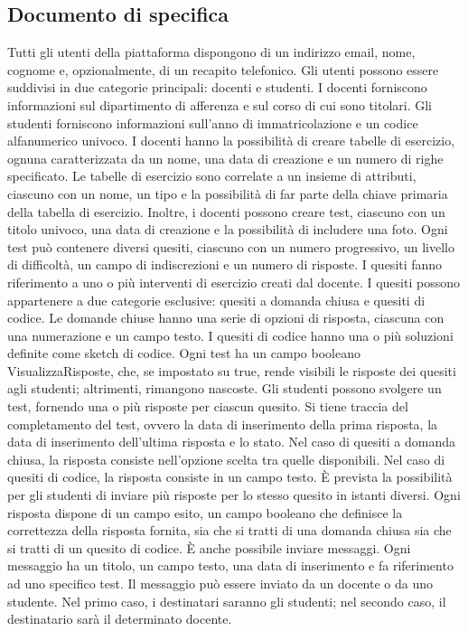 \documentclass{article}
\begin{document}
\subsection{Documento di specifica}
\large
Tutti gli utenti della piattaforma dispongono di un indirizzo email, nome, cognome e, opzionalmente, di un recapito telefonico. Gli utenti possono essere suddivisi in due categorie principali: docenti e studenti. I docenti forniscono informazioni sul dipartimento di afferenza e sul corso di cui sono titolari.
Gli studenti forniscono informazioni sull'anno di immatricolazione e un codice alfanumerico univoco.
I docenti hanno la possibilità di creare tabelle di esercizio, ognuna caratterizzata da un nome, una data di creazione e un numero di righe specificato. Le tabelle di esercizio sono correlate a un insieme di attributi, ciascuno con un nome, un tipo e la possibilità di far parte della chiave primaria della tabella di esercizio.
Inoltre, i docenti possono creare test, ciascuno con un titolo univoco, una data di creazione e la possibilità di includere una foto. Ogni test può contenere diversi quesiti, ciascuno con un numero progressivo, un livello di difficoltà, un campo di indiscrezioni e un numero di risposte. I quesiti fanno riferimento a uno o più interventi di esercizio creati dal docente.
I quesiti possono appartenere a due categorie esclusive: quesiti a domanda chiusa e quesiti di codice. Le domande chiuse hanno una serie di opzioni di risposta, ciascuna con una numerazione e un campo testo. I quesiti di codice hanno una o più soluzioni definite come sketch di codice.
Ogni test ha un campo booleano VisualizzaRisposte, che, se impostato su true, rende visibili le risposte dei quesiti agli studenti; altrimenti, rimangono nascoste. Gli studenti possono svolgere un test, fornendo una o più risposte per ciascun quesito. Si tiene traccia del completamento del test, ovvero la data di inserimento della prima risposta, la data di inserimento dell'ultima risposta e lo stato.
Nel caso di quesiti a domanda chiusa, la risposta consiste nell'opzione scelta tra quelle disponibili. Nel caso di quesiti di codice, la risposta consiste in un campo testo. È prevista la possibilità per gli studenti di inviare più risposte per lo stesso quesito in istanti diversi. Ogni risposta dispone di un campo esito, un campo booleano che definisce la correttezza della risposta fornita, sia che si tratti di una domanda chiusa sia che si tratti di un quesito di codice.
È anche possibile inviare messaggi. Ogni messaggio ha un titolo, un campo testo, una data di inserimento e fa riferimento ad uno specifico test. Il messaggio può essere inviato da un docente o da uno studente. Nel primo caso, i destinatari saranno gli studenti; nel secondo caso, il destinatario sarà il determinato docente.
\end{document}
